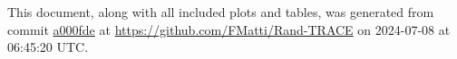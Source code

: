 This document, along with all included plots and tables, was generated from commit \href{https://github.com/FMatti/Rand-TRACE/tree/a000fde}{a000fde} at \url{https://github.com/FMatti/Rand-TRACE} on 2024-07-08 at 06:45:20 UTC.
